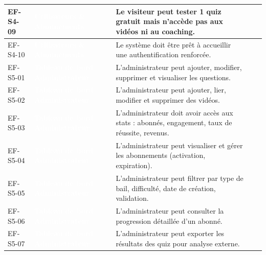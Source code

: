 \begin{longtable}{|P{1.75cm}|P{2.65cm}|P{7.45cm}|P{1.80cm}|P{1.55cm}|}
EF-S4-09 & \textcolor{white}{\textbf{Utilisateurs \& Abonnements}} & Le visiteur peut tester 1 quiz gratuit mais n’accède pas aux vidéos ni au coaching. &  &  \\ \hline
EF-S4-10 & \textcolor{white}{\textbf{Utilisateurs \& Abonnements}} & Le système doit être prêt à accueillir une authentification renforcée. &  &  \\ \hline
EF-S5-01 & \textcolor{white}{\textbf{Tableau de bord Administrateur}} & L’administrateur peut ajouter, modifier, supprimer et visualiser les questions. &  &  \\ \hline
EF-S5-02 & \textcolor{white}{\textbf{Tableau de bord Administrateur}} & L’administrateur peut ajouter, lier, modifier et supprimer des vidéos. &  &  \\ \hline
EF-S5-03 & \textcolor{white}{\textbf{Tableau de bord Administrateur}} & L’administrateur doit avoir accès aux stats : abonnés, engagement, taux de réussite, revenus. &  &  \\ \hline
EF-S5-04 & \textcolor{white}{\textbf{Tableau de bord Administrateur}} & L'administrateur peut visualiser et gérer les abonnements (activation, expiration). &  &  \\ \hline
EF-S5-05 & \textcolor{white}{\textbf{Tableau de bord Administrateur}} & L’administrateur peut filtrer par type de bail, difficulté, date de création, validation. &  &  \\ \hline
EF-S5-06 & \textcolor{white}{\textbf{Tableau de bord Administrateur}} & L’administrateur peut consulter la progression détaillée d’un abonné. &  &  \\ \hline
EF-S5-07 & \textcolor{white}{\textbf{Tableau de bord Administrateur}} & L’administrateur peut exporter les résultats des quiz pour analyse externe. &  &  \\ \hline

\end{longtable}
